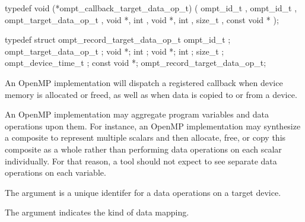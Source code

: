 \label{sec:ompt_callback_target_data_op_t}
\format


\begin{ccppspecific}
\begin{omptCallback}
typedef void (*ompt_callback_target_data_op_t) (
  ompt_id_t ,
  ompt_id_t ,
  ompt_target_data_op_t ,
  void *,
  int ,
  void *,
  int ,
  size_t ,
  const void *
);
\end{omptCallback}
\end{ccppspecific}


\record

\begin{ccppspecific}
\begin{omptRecord}
typedef struct ompt_record_target_data_op_t {
  ompt_id_t ;
  ompt_target_data_op_t ;
  void *;
  int ;
  void *;
  int ;
  size_t ;
  ompt_device_time_t ;
  const void *;
} ompt_record_target_data_op_t;
\end{omptRecord}
\end{ccppspecific}


\descr
An OpenMP implementation will dispatch a registered  callback
when device memory is allocated or freed, as well as when data is copied to or from a device. 

\begin{note}

An OpenMP implementation may aggregate program variables and data
operations upon them.  For instance, an OpenMP implementation may
synthesize a composite to represent multiple scalars and then
allocate, free, or copy this composite as a whole rather than
performing data operations on each scalar individually.  For that
reason, a tool should not expect to see separate data operations
on each variable.

\end{note}

\argdesc

The argument  is a unique identifer for a data
operations on a target device.

The argument  indicates the kind of data mapping.

